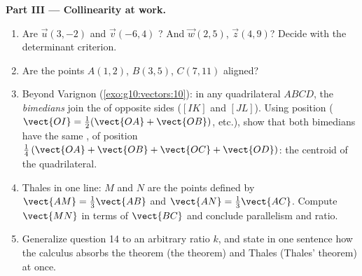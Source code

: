 \begin{problem}
\medskip
\noindent\textbf{Part III --- Collinearity at work.}
\begin{enumerate}[resume]
  \item Are $\vec u(3, -2)$ and $\vec v(-6, 4)$ ? And
        $\vec w(2, 5)$, $\vec z(4, 9)$? Decide with the
        determinant criterion.
  \item Are the points $A(1, 2)$, $B(3, 5)$, $C(7, 11)$
        aligned?
  \item Beyond Varignon (\cref{exo:g10:vectors:10}): in any
        quadrilateral $ABCD$, the \emph{bimedians} join the
         of opposite sides ($[IK]$ and $[JL]$). Using
        position  ($\vect{OI} = \frac12(\vect{OA} +
        \vect{OB})$, etc.), show that both bimedians have the
        same , of position 
        $\frac14\left(\vect{OA} + \vect{OB} + \vect{OC} +
        \vect{OD}\right)$: the centroid of the quadrilateral.
  \item Thales in one line: $M$ and $N$ are the points defined
        by $\vect{AM} = \frac13\vect{AB}$ and
        $\vect{AN} = \frac13\vect{AC}$. Compute
        $\vect{MN}$ in terms of $\vect{BC}$ and conclude
        parallelism and ratio.
  \item Generalize question 14 to an arbitrary ratio $k$, and
        state in one sentence how the  calculus absorbs
        the  theorem (the  theorem)
        and Thales (Thales' theorem) at once.
\end{enumerate}


\end{problem}
